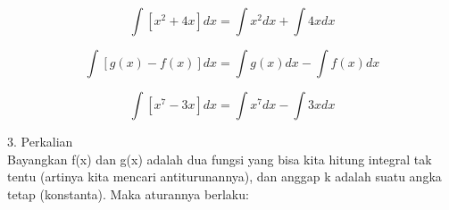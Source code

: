 \documentclass[a4paper,10pt]{article}
\begin{document}
\begin{eulernotebook}
\begin{eulercomment}
\begin{eulercomment}
\begin{eulercomment}
\begin{eulercomment}
\begin{eulercomment}
\begin{eulercomment}
\begin{eulercomment}
\begin{eulercomment}
\begin{eulercomment}
\begin{eulercomment}
\begin{eulercomment}
\begin{eulercomment}
\begin{eulercomment}
\begin{eulercomment}
\begin{eulercomment}
\begin{eulercomment}
\begin{eulercomment}
\begin{eulercomment}
\begin{eulercomment}
\begin{eulercomment}
\begin{eulercomment}
\begin{eulercomment}
\begin{eulerformula}
\[
\int [x^2+4x] dx = \int x^2 dx + \int 4x dx
\]
\end{eulerformula}
\begin{eulerformula}
\[
\int[g(x)-f(x)]dx = \int g(x) dx - \int f(x)dx
\]
\end{eulerformula}
\begin{eulerformula}
\[
\int [x^7-3x] dx = \int x^7 dx - \int 3x dx
\]
\end{eulerformula}
\begin{eulercomment}
3. Perkalian\\
Bayangkan f(x) dan g(x) adalah dua fungsi yang bisa kita hitung
integral tak tentu (artinya kita mencari antiturunannya), dan anggap k
adalah suatu angka tetap (konstanta). Maka aturannya berlaku:


\end{eulercomment}
\end{eulercomment}
\end{eulercomment}
\end{eulercomment}
\end{eulercomment}
\end{eulercomment}
\end{eulercomment}
\end{eulercomment}
\end{eulercomment}
\end{eulercomment}
\end{eulercomment}
\end{eulercomment}
\end{eulercomment}
\end{eulercomment}
\end{eulercomment}
\end{eulercomment}
\end{eulercomment}
\end{eulercomment}
\end{eulercomment}
\end{eulercomment}
\end{eulercomment}
\end{eulercomment}
\end{eulercomment}
\end{eulernotebook}
\end{document}
